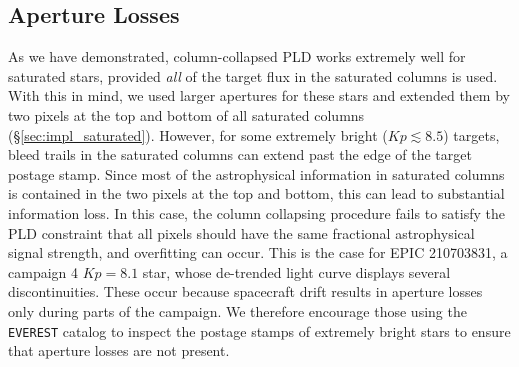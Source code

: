\documentclass[]{emulateapj}
\newcommand{\Kp}{\ensuremath{Kp}}
\begin{document}
\subsection{Aperture Losses}
\label{sec:losses}
As we have demonstrated, column-collapsed PLD works extremely well for saturated stars,
provided \emph{all} of the target flux in the saturated columns is used. With this
in mind, we used larger apertures for these stars and
extended them by two pixels at the top and bottom of all saturated columns
(\S\ref{sec:impl_saturated}). However, for some extremely bright ($\Kp \lesssim 8.5$)
targets, bleed trails in the saturated columns can extend past the edge of the
target postage stamp. Since most of the astrophysical information in saturated columns
is contained in the two pixels at the top and bottom, this can lead to substantial
information loss. In this case, the column collapsing procedure fails to satisfy the
PLD constraint that all pixels should have the same fractional astrophysical signal
strength, and overfitting can occur. This is the case for EPIC 210703831, a campaign 4
$\Kp = 8.1$ star, whose de-trended light curve displays several discontinuities. These
occur because spacecraft drift results in aperture losses only during parts of the
campaign. We therefore encourage those using the \texttt{EVEREST} catalog to inspect
the postage stamps of extremely bright stars to ensure that aperture losses are not
present.
%
\end{document}
